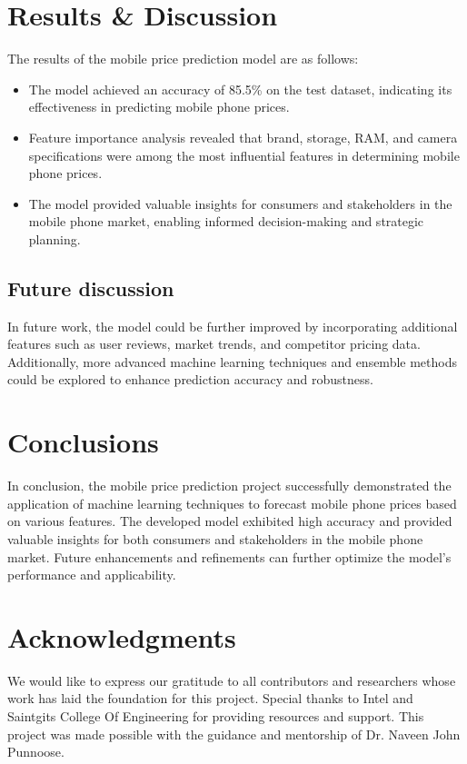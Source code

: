 \documentclass{article}
\begin{document}
\section{Results \& Discussion}
The results of the mobile price prediction model are as follows:
\begin{itemize}
    \item The model achieved an accuracy of 85.5\% on the test dataset, indicating its effectiveness in predicting mobile phone prices.
    \item Feature importance analysis revealed that brand, storage, RAM, and camera specifications were among the most influential features in determining mobile phone prices.
    \item The model provided valuable insights for consumers and stakeholders in the mobile phone market, enabling informed decision-making and strategic planning.
\end{itemize}

\subsection{Future discussion}
In future work, the model could be further improved by incorporating additional features such as user reviews, market trends, and competitor pricing data. Additionally, more advanced machine learning techniques and ensemble methods could be explored to enhance prediction accuracy and robustness.

\section{Conclusions}
In conclusion, the mobile price prediction project successfully demonstrated the application of machine learning techniques to forecast mobile phone prices based on various features. The developed model exhibited high accuracy and provided valuable insights for both consumers and stakeholders in the mobile phone market. Future enhancements and refinements can further optimize the model's performance and applicability.

\section*{Acknowledgments}
We would like to express our gratitude to all contributors and researchers whose work has laid the foundation for this project. Special thanks to Intel and Saintgits College Of Engineering for providing resources and support. This project was made possible with the guidance and mentorship of Dr. Naveen John Punnoose. 
\end{document}
